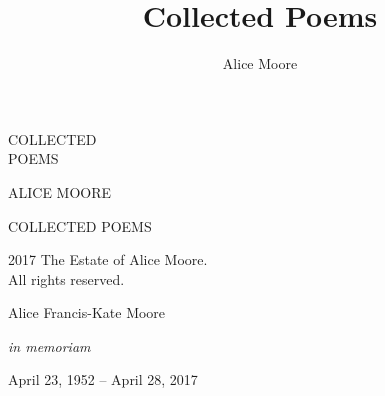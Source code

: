 \documentclass[twoside,openright,final]{memoir}
\title{Collected Poems}
\author{Alice Moore}
\date{}
\begin{document}
\setlength\epigraphwidth{5cm}
\setlength\epigraphrule{0pt}
\epigraphfontsize{\footnotesize}

\setlength\vgap{2.5em}
\setlength\vleftskip{0.5em}

\PlainPoemTitle

\renewcommand{\printPoemTitletitle}[1]{\PoemTitlefont \uppercase{#1}}

\pagestyle{empty}

\frontmatter

\begin{titlingpage}
\begingroup
\newlength{\drop}
\setlength{\drop}{0.12\textheight}
\vspace*{\drop}
\begin{center}
{\noindent\Huge COLLECTED}\\[\baselineskip]
{\Huge POEMS}\par
\vspace*{3\drop}
{\noindent\large \textsc{ALICE MOORE}}
\end{center}
\endgroup

\clearpage

\begingroup
\footnotesize
\begin{flushleft}
\textsc{COLLECTED POEMS}

\textcopyright{} 2017 The Estate of Alice Moore.\\
All rights reserved.
\end{flushleft}
\endgroup
\end{titlingpage}

\begingroup
\clearpage\mbox{}\vfill\centering%
Alice Francis-Kate Moore

\textit{in memoriam}

April 23, 1952 -- April 28, 2017
\par\vfill\cleardoublepage
\endgroup

\setlength{\cftsectionindent}{3.8em}
\tableofcontents*
\clearpage

\renewcommand*{\printbookname}{}
\renewcommand*{\printbooknum}{}
\renewcommand*{\printpartnum}{}
\renewcommand*{\printpartname}{}

\renewcommand{\booktitlefont}{\normalfont\Huge\scshape}


\mainmatter
\pagestyle{myheadings}
\end{document}
